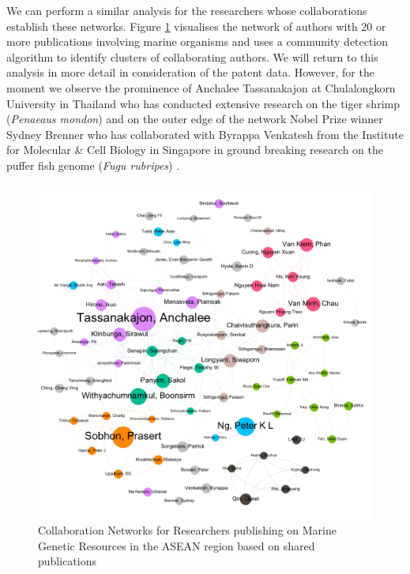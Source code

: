 \documentclass[openany]{book}
\theoremstyle{definition}
\theoremstyle{definition}
\theoremstyle{definition}
\theoremstyle{remark}
\begin{document}
We can perform a similar analysis for the researchers whose
collaborations establish these networks. Figure \ref{fig:authornetwork}
visualises the network of authors with 20 or more publications involving
marine organisms and uses a community detection algorithm to identify
clusters of collaborating authors. We will return to this analysis in
more detail in consideration of the patent data. However, for the moment
we observe the prominence of Anchalee Tassanakajon at Chulalongkorn
University in Thailand who has conducted extensive research on the tiger
shrimp (\emph{Penaeaus mondon}) and on the outer edge of the network
Nobel Prize winner Sydney Brenner who has collaborated with Byrappa
Venkatesh from the Institute for Molecular \& Cell Biology in Singapore
in ground breaking research on the puffer fish genome (\emph{Fugu
rubripes}) \citep{Brenner_1993}.

\begin{figure}

{\centering \includegraphics[width=1\linewidth]{images/aseanmarinlit_author20plus} 

}

\caption{Collaboration Networks for Researchers publishing on Marine Genetic Resources in the ASEAN region based on shared publications}\label{fig:authornetwork}
\end{figure}
\end{document}
